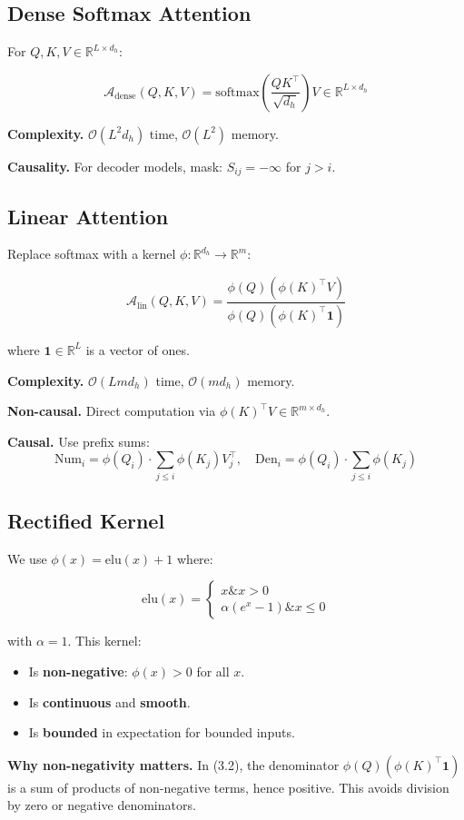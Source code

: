 \subsection{Dense Softmax Attention}

For $Q, K, V \in \mathbb{R}^{L \times d_h}$:

\[
\mathcal{A}_\text{dense}(Q, K, V) = \text{softmax}\!\left(\frac{Q K^\top}{\sqrt{d_h}}\right) V \in \mathbb{R}^{L \times d_h}
\]

\textbf{Complexity.} $\mathcal{O}(L^2 d_h)$ time, $\mathcal{O}(L^2)$ memory.

\textbf{Causality.} For decoder models, mask: $S_{ij} = -\infty$ for $j > i$.

\subsection{Linear Attention}

Replace softmax with a kernel $\phi: \mathbb{R}^{d_h} \to \mathbb{R}^m$:

\[
\mathcal{A}_\text{lin}(Q, K, V) = \frac{\phi(Q) \left(\phi(K)^\top V\right)}{\phi(Q) \left(\phi(K)^\top \mathbf{1}\right)}
\]

where $\mathbf{1} \in \mathbb{R}^L$ is a vector of ones.

\textbf{Complexity.} $\mathcal{O}(L m d_h)$ time, $\mathcal{O}(m d_h)$ memory.

\textbf{Non-causal.} Direct computation via $\phi(K)^\top V \in \mathbb{R}^{m \times d_h}$.

\textbf{Causal.} Use prefix sums:
\[
\text{Num}_i = \phi(Q_i) \cdot \sum_{j \le i} \phi(K_j) V_j^\top, \quad
\text{Den}_i = \phi(Q_i) \cdot \sum_{j \le i} \phi(K_j)
\]

\subsection{Rectified Kernel}

We use $\phi(x) = \mathrm{elu}(x) + 1$ where:

\[
\mathrm{elu}(x) = \begin{cases} x \& x > 0 \\ \alpha (e^x - 1) \& x \leq 0 \end{cases}
\]

with $\alpha = 1$. This kernel:

\begin{itemize}
\item Is \textbf{non-negative}: $\phi(x) > 0$ for all $x$.
\item Is \textbf{continuous} and \textbf{smooth}.
\item Is \textbf{bounded} in expectation for bounded inputs.

\end{itemize}
\textbf{Why non-negativity matters.} In (3.2), the denominator 
$\phi(Q) (\phi(K)^\top \mathbf{1})$ is a sum of products of non-negative 
terms, hence positive. This avoids division by zero or negative denominators.

